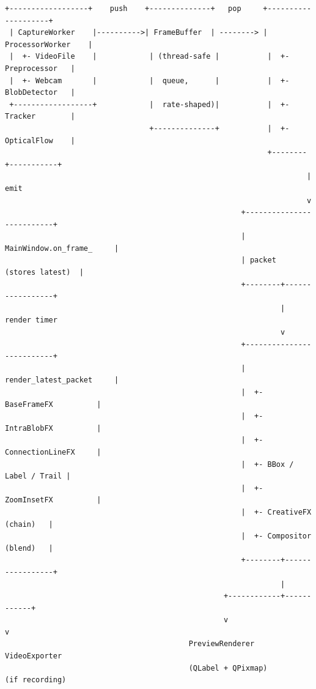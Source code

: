 \documentclass[11pt,a4paper,openany]{report}
\begin{document}
\begin{lstlisting}[basicstyle=\ttfamily\footnotesize]
 +------------------+    push    +--------------+   pop     +--------------------+
 | CaptureWorker    |---------->| FrameBuffer  | --------> | ProcessorWorker    |
 |  +- VideoFile    |            | (thread-safe |           |  +- Preprocessor   |
 |  +- Webcam       |            |  queue,      |           |  +- BlobDetector   |
 +------------------+            |  rate-shaped)|           |  +- Tracker        |
                                 +--------------+           |  +- OpticalFlow    |
                                                            +--------+-----------+
                                                                     | emit
                                                                     v
                                                      +--------------------------+
                                                      | MainWindow.on_frame_     |
                                                      | packet  (stores latest)  |
                                                      +--------+-----------------+
                                                               | render timer
                                                               v
                                                      +--------------------------+
                                                      | render_latest_packet     |
                                                      |  +- BaseFrameFX          |
                                                      |  +- IntraBlobFX          |
                                                      |  +- ConnectionLineFX     |
                                                      |  +- BBox / Label / Trail |
                                                      |  +- ZoomInsetFX          |
                                                      |  +- CreativeFX (chain)   |
                                                      |  +- Compositor (blend)   |
                                                      +--------+-----------------+
                                                               |
                                                  +------------+------------+
                                                  v                         v
                                          PreviewRenderer            VideoExporter
                                          (QLabel + QPixmap)         (if recording)
\end{lstlisting}
\end{document}
